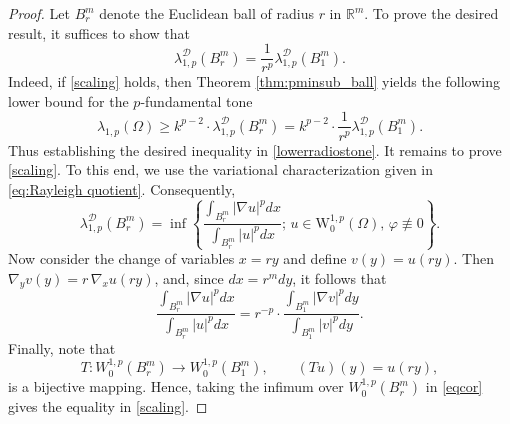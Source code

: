 \documentclass[10pt,a4paper]{amsart}
\begin{document}
\begin{proof}
Let $B_r^{m}$ denote the Euclidean ball of radius $r$ in $\mathbb{R}^{m}$. To prove the desired result, it suffices to show that
\begin{equation}\label{scaling}
    \lambda_{1,p}^{\mathcal{D}}(B^{m}_r) = \frac{1}{r^p}\lambda_{1,p}^{\mathcal D}(B_1^m).
\end{equation}
Indeed, if \eqref{scaling} holds, then Theorem \ref{thm:pminsub_ball}
yields the following lower bound for the $p$-fundamental tone
\begin{equation}
    \lambda_{1,p}(\Omega) \geq k^{p-2} \cdot \lambda_{1,p}^{\mathcal{D}}(B^{m}_r) = k^{p-2} \cdot \frac{1}{r^p}\lambda_{1,p}^{\mathcal D}(B_1^m).
\end{equation}
Thus establishing the desired inequality in \eqref{lowerradiostone}.
It remains to prove \eqref{scaling}. To this end, we use the variational
characterization given in \eqref{eq:Rayleigh quotient}. Consequently,
\begin{equation}
      \lambda_{1,p}^{\mathcal{D}}(B^{m}_r)
    = \inf \left\{ \frac{\displaystyle \int_{B^{m}_r} |\nabla u |^p dx} {\displaystyle \int_{B^{m}_r} |u|^p dx}; \, u \in \mathrm{W}^{1,p}_0(\Omega), \, \varphi \not\equiv 0
    \right\}.
\end{equation}
Now consider the change of variables $x=ry$ and define $v(y)=u(ry)$. Then
$\nabla_y v(y)= r\, \nabla_x u(ry)$, and, since $dx = r^{m}dy$, it follows that 
\begin{equation}\label{eqcor}
     \frac{\displaystyle \int_{B^{m}_r} |\nabla u |^p dx} {\displaystyle \int_{B^{m}_r} |u|^p dx} =  r^{-p} \cdot\frac{\displaystyle \int_{B^{m}_1} |\nabla v |^p dy} {\displaystyle \int_{B^{m}_1} |v|^p dy}.
\end{equation}
Finally, note that 
\[
T\colon W^{1,p}_0(B_r^{m}) \to W^{1,p}_0(B_1^{m}), 
\qquad (Tu)(y) = u(ry),
\]
is a bijective mapping. Hence, taking the infimum over 
$W^{1,p}_0(B_r^{m})$ in \eqref{eqcor} gives the equality in \eqref{scaling}.
\end{proof}
\end{document}

